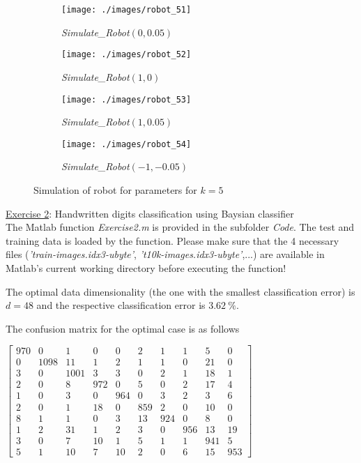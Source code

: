 \begin{figure}[hb]
	\centering
	\begin{subfigure}[b]{.45\linewidth}
	\texttt{[image: ./images/robot\_51]}
	\caption{\textit{Simulate\_Robot}$(0, 0.05)$}\label{fig:robot_simulation_2}
	\end{subfigure}
	\begin{subfigure}[b]{.45\linewidth}
	\texttt{[image: ./images/robot\_52]}
	\caption{\textit{Simulate\_Robot}$(1, 0)$}\label{fig:robot_simulation_3}
	\end{subfigure}
	\begin{subfigure}[b]{.45\linewidth}
	\texttt{[image: ./images/robot\_53]}
	\caption{\textit{Simulate\_Robot}$(1, 0.05)$}\label{fig:robot_simulation_4}
	\end{subfigure}
	\begin{subfigure}[b]{.45\linewidth}
	\texttt{[image: ./images/robot\_54]}
	\caption{\textit{Simulate\_Robot}$(-1, -0.05)$}\label{fig:robot_simulation_5}
	\end{subfigure}

	\caption{Simulation of robot for parameters for $k = 5$}
	\label{fig:robot_simulations}
\end{figure}

\FloatBarrier
\newpage

\ul{Exercise 2}: Handwritten digits classification using Baysian classifier \\[3mm]

The Matlab function \textit{Exercise2.m} is provided
in the subfolder \textit{Code}. The test and training data is loaded
by the function. Please make sure that the 4 necessary files
(\textit{'train-images.idx3-ubyte'},
\textit{'t10k-images.idx3-ubyte'},...) are available in Matlab's current working directory before executing the function!

The optimal data dimensionality (the one with the smallest classification error) is $d = 48$ and the respective classification error is $3.62~\%$.


The confusion matrix for the optimal case is as follows

\begin{center}
$
\begin{bmatrix}
	970 & 0 & 1 & 0 & 0 & 2 & 1 & 1 & 5 & 0 \\
	0 & 1098 & 11 & 1 & 2 & 1 & 1 & 0 & 21 & 0 \\
	3 & 0 & 1001 & 3 & 3 & 0 & 2 & 1 & 18 & 1 \\
	2 & 0 & 8 & 972 & 0 & 5 & 0 & 2 & 17 & 4 \\
	1 & 0 & 3 & 0 & 964 & 0 & 3 & 2 & 3 & 6 \\
	2 & 0 & 1 & 18 & 0 & 859 & 2 & 0 & 10 & 0 \\
	8 & 1 & 1 & 0 & 3 & 13 & 924 & 0 & 8 & 0 \\
	1 & 2 & 31 & 1 & 2 & 3 & 0 & 956 & 13 & 19 \\
	3 & 0 & 7 & 10 & 1 & 5 & 1 & 1 & 941 & 5 \\
	5 & 1 & 10 & 7 & 10 & 2 & 0 & 6 & 15 & 953
\end{bmatrix}\label{eqn:confusion_matrix}
$
\end{center}

